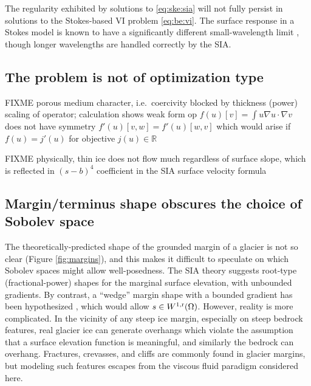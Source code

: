 \documentclass[hidelinks,onefignum,onetabnum,final]{siamart220329}  %
\newcommand{\RR}{\mathbb{R}}
\newcommand{\grad}{\nabla}
\newcommand{\rr}{{\text{\textnormal{r}}}}
\begin{document}
The regularity exhibited by solutions to \eqref{eq:ske:sia} will not fully persist in solutions to the Stokes-based VI problem \eqref{eq:be:vi}.  The surface response in a Stokes model is known to have a significantly different small-wavelength limit \cite{Pattynetal2008}, though longer wavelengths are handled correctly by the SIA.

\subsection{The problem is not of optimization type} \label{subsec:notopt}  FIXME porous medium character, i.e.~coercivity blocked by thickness (power) scaling of operator; calculation shows weak form op $f(u)[v] = \int u \grad u\cdot \grad v$ does not have symmetry $f'(u)[v,w] = f'(u)[w,v]$ which would arise if $f(u)=j'(u)$ for objective $j(u) \in \RR$

FIXME physically, thin ice does not flow much regardless of surface slope, which is reflected in $(s-b)^4$ coefficient in the SIA surface velocity formula

\subsection{Margin/terminus shape obscures the choice of Sobolev space} \label{subsec:margin}  The theoretically-predicted shape of the grounded margin of a glacier is not so clear (Figure \ref{fig:margins}), and this makes it difficult to speculate on which Sobolev spaces might allow well-posedness.  The SIA theory suggests root-type (fractional-power) shapes \cite{Bueleretal2005} for the marginal surface elevation, with unbounded gradients.  By contrast, a ``wedge'' margin shape with a bounded gradient has been hypothesized \cite[for example]{EchelmeyerKamb1986}, which would allow $s\in W^{1,\rr}(\Omega)$.  However, reality is more complicated.  In the vicinity of any steep ice margin, especially on steep bedrock features, real glacier ice can generate overhangs which violate the assumption that a surface elevation function is meaningful, and similarly the bedrock can overhang.  Fractures, crevasses, and cliffs are commonly found in glacier margins, but modeling such features escapes from the viscous fluid paradigm considered here.
\end{document}
